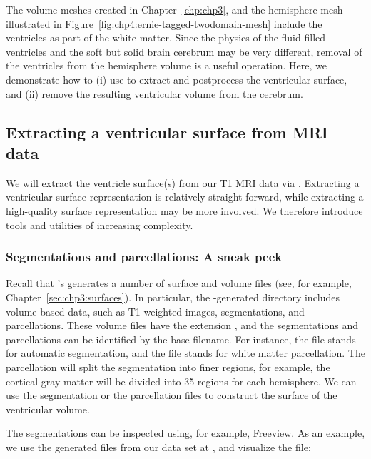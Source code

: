 The volume meshes created in Chapter~\ref{chp:chp3}, and the
hemisphere mesh illustrated in
Figure~\ref{fig:chp4:ernie-tagged-twodomain-mesh} include the
ventricles as part of the white matter. Since the physics of the
fluid-filled ventricles and the soft but solid brain cerebrum may be
very different, removal of the ventricles from the hemisphere volume
is a useful operation. Here, we demonstrate how to (i) use
{\freesurfer} to extract and postprocess the ventricular surface, and
(ii) remove the resulting ventricular volume from the cerebrum.

\subsection{Extracting a ventricular surface from MRI data}
\label{sec:chp4:tools:remove-vent:extraction}  

We will extract the ventricle surface(s) from our T1 MRI data via
{\freesurfer}. Extracting a ventricular surface representation is
relatively straight-forward, while extracting a high-quality surface
representation may be more involved. We therefore introduce tools and
utilities of increasing complexity.

\subsubsection*{Segmentations and parcellations: A sneak peek}
 
 Recall that \freesurfer's
 generates a number of surface and volume files (see,
for example, Chapter~\ref{sec:chp3:surfaces}). In particular, the
\freesurfer{}-generated  directory includes volume-based
data, such as T1-weighted images, segmentations, and
parcellations. These volume files have the extension , and
the segmentations and parcellations can be identified by the base
filename. For instance, the file  stands for automatic
segmentation, and the file  stands for white matter
parcellation. The parcellation will split the segmentation into finer
regions, for example, the cortical gray matter will be divided into 35
regions for each hemisphere. We can use the segmentation or the
parcellation files to construct the surface of the ventricular volume.

The segmentations can be inspected using, for example, Freeview. As an
example, we use the \freesurfer{} generated files from our data set at
, and visualize the  file:

